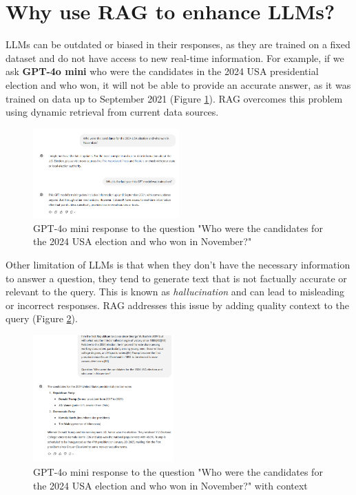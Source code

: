 \documentclass[conference]{IEEEtran}
\begin{document}
\section{Why use RAG to enhance LLMs?}
LLMs can be outdated or biased in their responses, as they are trained on a fixed dataset and do not have access to new real-time information.
For example, if we ask \textbf{GPT-4o mini} who were the candidates in the 2024 USA presidential election and who won,
it will not be able to provide an accurate answer, as it was trained on data up to September 2021 (Figure \ref{fig:gpt4o_mini_response}).
RAG overcomes this problem using dynamic retrieval from current data sources.

\begin{figure}[htbp!]
    \centerline{\includegraphics[width=0.5\textwidth]{images/gpt4o_mini_response.png}}
    \caption{GPT-4o mini response to the question "Who were the candidates for the 2024 USA election and who won in November?"}
    \label{fig:gpt4o_mini_response}
\end{figure}

\break

Other limitation of LLMs is that when they don't have the necessary information to answer a question, they tend to generate text
that is not factually accurate or relevant to the query. This is known as \textit{hallucination} and can lead to misleading or incorrect responses.
RAG addresses this issue by adding quality context to the query (Figure \ref{fig:gpt4o_with_context}).

\begin{figure}[htbp!]
    \centerline{\includegraphics[width=0.48\textwidth]{images/gpt4o_with_context.png}}
    \caption{GPT-4o mini response to the question "Who were the candidates for the 2024 USA election and who won in November?" with context}
    \label{fig:gpt4o_with_context}
\end{figure}
\end{document}
